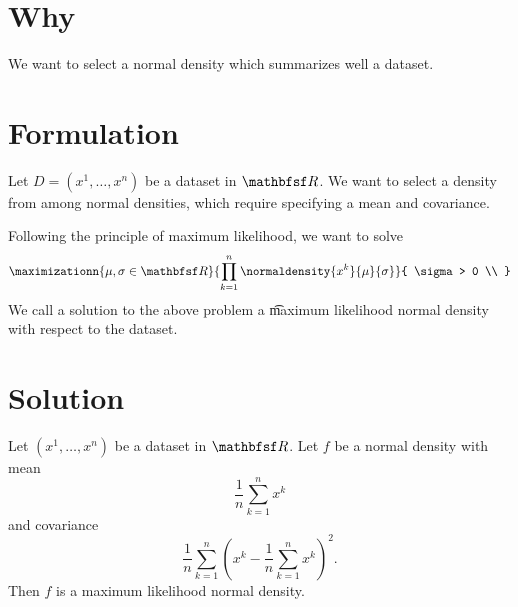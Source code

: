 

\section*{Why}

We want to select a normal density which summarizes well a dataset.

\section*{Formulation}

Let $D = (x^1, \dots , x^n)$ be a dataset in $\R $.
We want to select a density from among normal densities, which require specifying a mean and covariance.

Following the principle of maximum likelihood, we want to solve
\[
\maximizationn{\mu ,\sigma  \in \R }{
\prod_{k = 1}^{n} \normaldensity{x^k}{\mu }{\sigma }
}{
\sigma  > 0 \\
}
\]
We call a solution to the above problem a \t{maximum likelihood normal density} with respect to the dataset.

\section*{Solution}

\begin{proposition}
Let $(x^1, \dots , x^n)$ be a dataset in $\R $.
Let $f$ be a normal density with mean
\[
\frac{1}{n} \sum_{k = 1}^{n} x^k
\]
and covariance
\[
\frac{1}{n} \sum_{k = 1}^{n} \left(x^k - \frac{1}{n} \sum_{k = 1}^{n} x^k\right)^2.
\]
Then $f$ is a maximum likelihood normal density.
\end{proposition}


